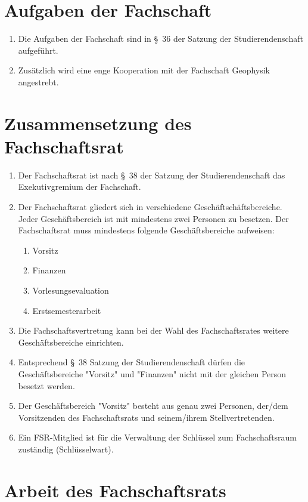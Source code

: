\documentclass[
	a4paper,
	12pt,
	oneside,
	parskip=half-,
	pagesize,
	headsepline,
	german,
	ngerman
]{scrartcl}
\begin{document}
\section{Aufgaben der Fachschaft}
\begin{enumerate}
	\item Die Aufgaben der Fachschaft sind in §~36 der Satzung der Studierendenschaft aufgeführt.
	\item Zusätzlich wird eine enge Kooperation mit der Fachschaft Geophysik angestrebt.
\end{enumerate}

\section{Zusammensetzung des Fachschaftsrat}
\begin{enumerate}
	\item Der Fachschaftsrat ist nach §~38 der Satzung der Studierendenschaft das Exekutivgremium der Fachschaft.
	\item Der Fachschaftsrat gliedert sich in verschiedene Geschäftschäftsbereiche. Jeder Geschäftsbereich ist mit mindestens zwei Personen zu besetzen. Der Fachschaftsrat muss mindestens folgende Geschäftsbereiche aufweisen:
	\begin{enumerate}
		\item Vorsitz
		\item Finanzen
		\item Vorlesungsevaluation
		\item Erstsemesterarbeit
	\end{enumerate}
	\item Die Fachschaftsvertretung kann bei der Wahl des Fachschaftsrates weitere Geschäftsbereiche einrichten.
	\item Entsprechend §~38 Satzung der Studierendenschaft dürfen die Geschäftsbereiche "Vorsitz" und "Finanzen" nicht mit der gleichen Person besetzt werden.
	\item Der Geschäftsbereich "Vorsitz" besteht aus genau zwei Personen, der/dem Vorsitzenden des Fachschaftsrats und seinem/ihrem Stellvertretenden.
	\item Ein FSR-Mitglied ist für die Verwaltung der Schlüssel zum Fachschaftsraum zuständig (Schlüsselwart).
\end{enumerate}

\section{Arbeit des Fachschaftsrats}
\end{document}
